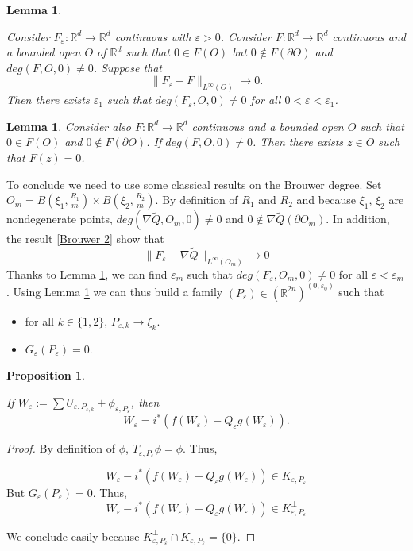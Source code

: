 \documentclass[12pt]{amsart}
\theoremstyle{plain}
\newtheorem{lemma}[theorem]{Lemma}       %
\newtheorem{proposition}[theorem]{Proposition}
\theoremstyle{definition}
\theoremstyle{remark}
\renewcommand{\epsilon}{\varepsilon}
\begin{document}
\begin{lemma}\label{Brouwer2}

Consider $F_{\epsilon}:\mathbb{R}^d \rightarrow \mathbb{R}^d$ continuous with $\epsilon >0$. Consider $F:\mathbb{R}^d\rightarrow\mathbb{R}^d$ continuous and a bounded open $O$ of $\mathbb{R}^d$ such that $0 \in F(O)$ but $0 \notin F(\partial O)$ and $deg(F,O,0) \ne 0$. Suppose that 
$$\|F_{\epsilon}-F\|_{L^\infty(O)}\rightarrow0.$$
Then there exists $\epsilon_1$ such that $deg(F_{\epsilon},O,0)\ne0$ for all $0<\epsilon<\epsilon_1$.


\end{lemma}
\begin{lemma}\label{solution}
Consider also $F:\mathbb{R}^d\rightarrow\mathbb{R}^d$ continuous and a bounded open $O$ such that $0 \in F(O)$ and $0 \notin F(\partial O)$. If $deg(F,O,0)\ne 0$. Then there exists $z \in O$ such that $F(z)=0$.
\end{lemma}
To conclude we need to use some classical results on the Brouwer degree. 
Set $O_m=B(\xi_1,\frac{R_1}{m})\times B(\xi_2,\frac{R_2}{m})$. By definition of $R_1$ and $R_2$ and because $\xi_1$, $\xi_2$ are nondegenerate points, $deg(\nabla\tilde{Q},O_m,0)\ne 0$ and $0 \notin \nabla \tilde{Q}(\partial O_m)$. In addition, the result \ref{Brouwer 2} show that 
$$\|F_{\epsilon}-\nabla\tilde{Q}\|_{L^\infty(O_m)}\rightarrow0$$
 Thanks to Lemma \ref{Brouwer2}, we can find $\epsilon_m$ such that $deg(F_\epsilon,O_m,0)\ne 0$ for all $\epsilon <\epsilon_m$. Using Lemma \ref{solution} we can thus build a family $(P_{\epsilon})\in (\mathbb{R}^{2n})^{(0,\epsilon_0)}$ such that
 
 \begin{itemize}
     \item for all $k \in \{1,2\}$, $P_{\epsilon,k}\rightarrow \xi_k$.
     \item $G_{\epsilon}(P_{\epsilon})=0$. 
 \end{itemize}

\begin{proposition}\label{end unbounded}

If $ W_{\epsilon}:=\sum U_{\epsilon,P_{\epsilon,k}}+\phi_{\epsilon,P_{\epsilon}}$, then 
$$W_{\epsilon}=i^*(f(W_\epsilon)-Q_{\epsilon}g(W_{\epsilon})).$$

\end{proposition}
 
\begin{proof}
By definition of $\phi$, $T_{\epsilon,P_{\epsilon}}\phi = \phi$. Thus, 

$$W_{\epsilon}-i^*(f(W_\epsilon)-Q_{\epsilon}g(W_{\epsilon}))\in K_{\epsilon,P_{\epsilon}}$$
But $G_{\epsilon}(P_{\epsilon})=0$. Thus, 
$$W_{\epsilon}-i^*(f(W_\epsilon)-Q_{\epsilon}g(W_{\epsilon}))\in K_{\epsilon,P_{\epsilon}}^\perp$$

We conclude easily because $K_{\epsilon,P_{\epsilon}}^\perp\cap K_{\epsilon,P_{\epsilon}} =\{0\}.$
\end{proof}
\end{document}
